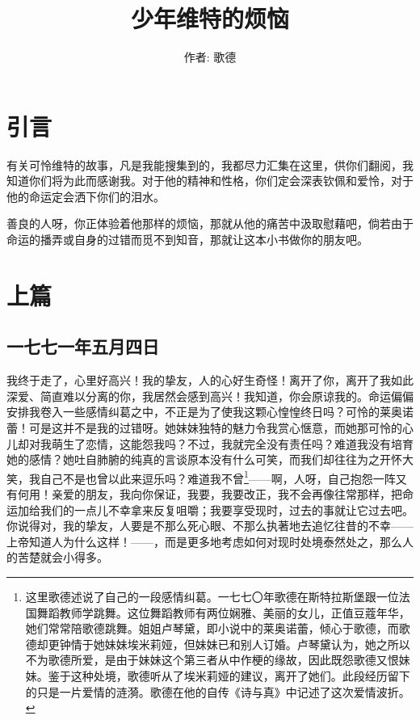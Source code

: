 \documentclass[12pt,oneside]{book}
\title{少年维特的烦恼}
\author{作者: 歌德}
\begin{document}
\maketitle
\tableofcontents



\part{引言}
\label{sec-1}

\begin{framed}
有关可怜维特的故事，凡是我能搜集到的，我都尽力汇集在这里，供你们翻阅，我知道你们将为此而感谢我。对于他的精神和性格，你们定会深表钦佩和爱怜，对于他的命运定会洒下你们的泪水。

善良的人呀，你正体验着他那样的烦恼，那就从他的痛苦中汲取慰藉吧，倘若由于命运的播弄或自身的过错而觅不到知音，那就让这本小书做你的朋友吧。
\end{framed}




\mainmatter
\part{上篇}
\label{sec-2}


\chapter{一七七一年五月四日}
\label{sec-2-1}
我终于走了，心里好高兴！我的挚友，人的心好生奇怪！离开了你，离开了我如此深爱、简直难以分离的你，我居然会感到高兴！我知道，你会原谅我的。命运偏偏安排我卷入一些感情纠葛之中，不正是为了使我这颗心惶惶终日吗？可怜的莱奥诺蕾！可是这并不是我的过错呀。她妹妹独特的魅力令我赏心惬意，而她那可怜的心儿却对我萌生了恋情，这能怨我吗？不过，我就完全没有责任吗？难道我没有培育她的感情？她吐自肺腑的纯真的言谈原本没有什么可笑，而我们却往往为之开怀大笑，我自己不是也曾以此来逗乐吗？难道我不曾\footnote{这里歌德述说了自己的一段感情纠葛。一七七〇年歌德在斯特拉斯堡跟一位法国舞蹈教师学跳舞。这位舞蹈教师有两位娴雅、美丽的女儿，正值豆蔻年华，她们常常陪歌德跳舞。姐姐卢琴黛，即小说中的莱奥诺蕾，倾心于歌德，而歌德却更钟情于她妹妹埃米莉娅，但妹妹已和别人订婚。卢琴黛认为，她之所以不为歌德所爱，是由于妹妹这个第三者从中作梗的缘故，因此既怨歌德又恨妹妹。鉴于这种处境，歌德听从了埃米莉娅的建议，离开了她们。此段经历留下的只是一片爱情的涟漪。歌德在他的自传《诗与真》中记述了这次爱情波折。}——啊，人呀，自己抱怨一阵又有何用！亲爱的朋友，我向你保证，我要，我要改正，我不会再像往常那样，把命运加给我们的一点儿不幸拿来反复咀嚼；我要享受现时，过去的事就让它过去吧。你说得对，我的挚友，人要是不那么死心眼、不那么执著地去追忆往昔的不幸——上帝知道人为什么这样！——，而是更多地考虑如何对现时处境泰然处之，那么人的苦楚就会小得多。
\end{document}
